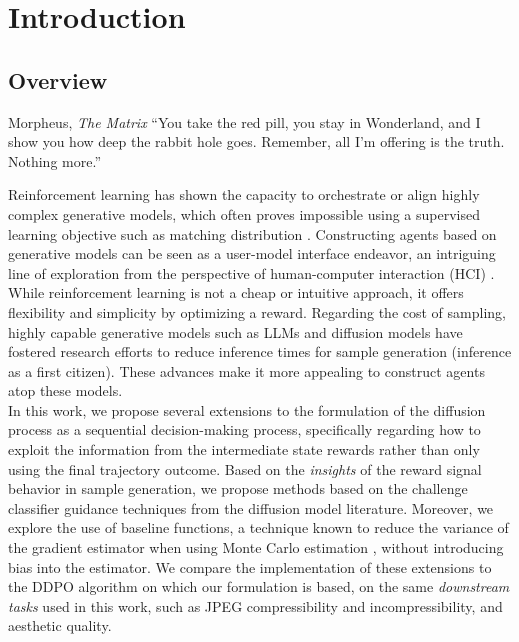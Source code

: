 \chapter{Introduction}

\section{Overview}

\begin{chapquote}{Morpheus, \textit{The Matrix}}
``You take the red pill, you stay in Wonderland, and I show you how deep the rabbit hole goes. Remember, all I'm offering is the truth. Nothing more.''
\end{chapquote}


Reinforcement learning has shown the capacity to orchestrate or align highly complex generative models, which often proves impossible using a supervised learning objective such as matching distribution .  Constructing agents based on generative models can be seen as a user-model interface endeavor, an intriguing line of exploration from the perspective of human-computer interaction (HCI) . While reinforcement learning is not a cheap or intuitive approach, it offers flexibility and simplicity by optimizing a reward. Regarding the cost of sampling, highly capable generative models such as LLMs and diffusion models have fostered research efforts to reduce inference times for sample generation (inference as a first citizen). These advances make it more appealing to construct agents atop these models. \\

\noindent In this work, we propose several extensions to the formulation of the diffusion process as a sequential decision-making process, specifically regarding how to exploit the information from the intermediate state rewards rather than only using the final trajectory outcome. Based on the \textit{insights} of the reward signal behavior in sample generation, we propose methods based on the challenge classifier guidance techniques from the diffusion model literature. Moreover, we explore the use of baseline functions, a technique known to reduce the variance of the gradient estimator when using Monte Carlo estimation \cite{mohamed2020monte}, without introducing bias into the estimator. We compare the implementation of these extensions to the DDPO algorithm \cite{black2023training} on which our formulation is based, on the same \textit{downstream tasks} used in this work, such as JPEG compressibility and incompressibility, and aesthetic quality. \\

